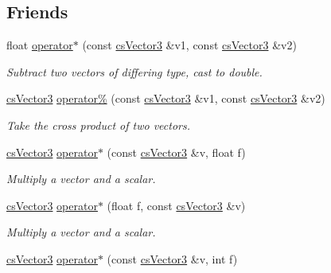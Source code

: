 \subsection*{Friends}
\begin{DoxyCompactItemize}
\item 
float \hyperlink{classcsVector3_a6b29c838ff34389fd676dd9a43fa1dea}{operator$\ast$} (const \hyperlink{classcsVector3}{cs\+Vector3} \&v1, const \hyperlink{classcsVector3}{cs\+Vector3} \&v2)
\begin{DoxyCompactList}\small\item\em Subtract two vectors of differing type, cast to double. \end{DoxyCompactList}\item 
\hyperlink{classcsVector3}{cs\+Vector3} \hyperlink{classcsVector3_a9cf0725e53867457381292b60987f4c0}{operator\%} (const \hyperlink{classcsVector3}{cs\+Vector3} \&v1, const \hyperlink{classcsVector3}{cs\+Vector3} \&v2)\hypertarget{classcsVector3_a9cf0725e53867457381292b60987f4c0}{}\label{classcsVector3_a9cf0725e53867457381292b60987f4c0}

\begin{DoxyCompactList}\small\item\em Take the cross product of two vectors. \end{DoxyCompactList}\item 
\hyperlink{classcsVector3}{cs\+Vector3} \hyperlink{classcsVector3_a30480a5e6806462c14a4f7b1f5a140e0}{operator$\ast$} (const \hyperlink{classcsVector3}{cs\+Vector3} \&v, float f)\hypertarget{classcsVector3_a30480a5e6806462c14a4f7b1f5a140e0}{}\label{classcsVector3_a30480a5e6806462c14a4f7b1f5a140e0}

\begin{DoxyCompactList}\small\item\em Multiply a vector and a scalar. \end{DoxyCompactList}\item 
\hyperlink{classcsVector3}{cs\+Vector3} \hyperlink{classcsVector3_a296fecdbf1967232b32a117087c3f145}{operator$\ast$} (float f, const \hyperlink{classcsVector3}{cs\+Vector3} \&v)\hypertarget{classcsVector3_a296fecdbf1967232b32a117087c3f145}{}\label{classcsVector3_a296fecdbf1967232b32a117087c3f145}

\begin{DoxyCompactList}\small\item\em Multiply a vector and a scalar. \end{DoxyCompactList}\item 
\hyperlink{classcsVector3}{cs\+Vector3} \hyperlink{classcsVector3_a4f17ab6a2d111192460718ba7cfcd690}{operator$\ast$} (const \hyperlink{classcsVector3}{cs\+Vector3} \&v, int f)\hypertarget{classcsVector3_a4f17ab6a2d111192460718ba7cfcd690}{}\label{classcsVector3_a4f17ab6a2d111192460718ba7cfcd690}


\end{DoxyCompactItemize}
